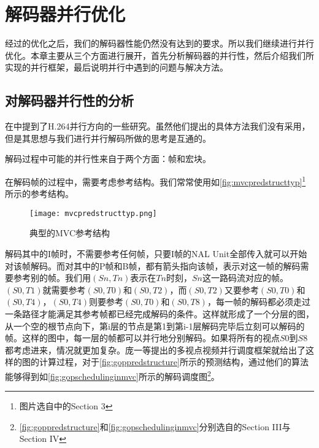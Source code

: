 
 
\cleardoublepage

\chapter{解码器并行优化}
\label{cha:parallelopt}

经过的优化之后，我们的解码器性能仍然没有达到的要求。所以我们继续进行并行优化。本章主要从三个方面进行展开，首先分析解码器的并行性，然后介绍我们所实现的并行框架，最后说明并行中遇到的问题与解决方法。

\section{对解码器并行性的分析}
\label{sec:parallelpossibility}

在中提到了H.264并行方向的一些研究\cite{li2005design,seitner2007macroblock,mesa2009scalability,yang2006parallel,ugur2007parallel}。虽然他们提出的具体方法我们没有采用，但是其思想与我们进行并行解码所做的思考是互通的。

解码过程中可能的并行性来自于两个方面：帧和宏块。

在解码帧的过程中，需要考虑参考结构。我们常常使用如\autoref{fig:mvcpredstructtyp}\footnote{图片选自中的Section 3}所示的参考结构。

\begin{figure}[htbp]
\begin{center}
\texttt{[image: mvcpredstructtyp.png]}
\caption{典型的MVC参考结构}
\label{fig:mvcpredstructtyp}
\end{center}
\end{figure}

解码其中的I帧时，不需要参考任何帧，只要I帧的NAL Unit全部传入就可以开始对该帧解码。而对其中的P帧和B帧，都有箭头指向该帧，表示对这一帧的解码需要参考别的帧。我们用$(Sn,Tn)$表示在$Tn$时刻，$Sn$这一路码流对应的帧。$(S0,T1)$就需要参考$(S0,T0)$和$(S0,T2)$，而$(S0,T2)$又要参考$(S0,T0)$和$(S0,T4)$，$(S0,T4)$则要参考$(S0,T0)$和$(S0,T8)$，每一帧的解码都必须走过一条路径才能满足其参考帧都已经完成解码的条件。这样就形成了一个分层的图，从一个空的根节点向下，第i层的节点是第1到第i-1层解码完毕后立刻可以解码的帧。这样的图中，每一层的帧都可以并行地分别解码。如果将所有的视点$S0$到$S8$都考虑进来，情况就更加复杂。庞一等提出的多视点视频并行调度框架\cite{pang2009framework}就给出了这样的图的计算过程，对于\autoref{fig:goppredstructure}所示的预测结构，通过他们的算法能够得到如\autoref{fig:gopschedulinginmvc}所示的解码调度图\footnote{\autoref{fig:goppredstructure}和\autoref{fig:gopschedulinginmvc}分别选自的Section III与Section IV}。

